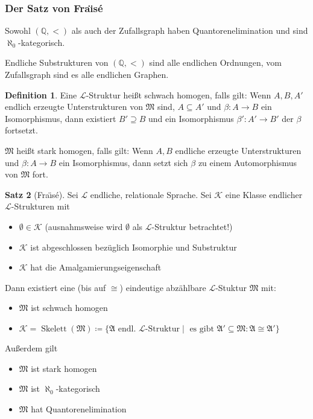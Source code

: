 \documentclass[12pt,parskip=full]{scrartcl}
\newcommand{\setQ}{\mathbb{Q}}
\theoremstyle{definition}
\newtheorem{theorem}{Satz}[section]
\newtheorem{definition}[theorem]{Definition}
\begin{document}
	\subsubsection{Der Satz von Fra\"\i s\'{e}}
	
	Sowohl $(\setQ, <)$ als auch der Zufallsgraph haben Quantorenelimination und sind $\aleph_0$-kategorisch.
	
	Endliche Substrukturen von $(\setQ, <)$ sind alle endlichen Ordnungen, vom Zufallsgraph sind es alle endlichen Graphen.
	
	\begin{definition}
		Eine $\mathcal{L}$-Struktur heißt schwach homogen, falls gilt: Wenn $A, B, A'$ endlich erzeugte Unterstrukturen von $\mathfrak{M}$ sind, $A \subseteq A'$ und $\beta: A \to B$ ein Isomorphismus, dann existiert $B' \supseteq B$ und ein Isomorphismus $\beta': A' \to B'$ der $\beta$ fortsetzt.
		
		$\mathfrak{M}$ heißt stark homogen, falls gilt: Wenn $A, B$ endliche erzeugte Unterstrukturen und $\beta: A \to B$ ein Isomorphismus, dann setzt sich $\beta$ zu einem Automorphismus von $\mathfrak{M}$ fort.
	\end{definition}

	\begin{theorem}[Fra\"\i s\'{e}]
		Sei $\mathcal{L}$ endliche, relationale Sprache. Sei $\mathcal{K}$ eine Klasse endlicher $\mathcal{L}$-Strukturen mit
		\begin{itemize}
			\item $\emptyset \in \mathcal{K}$ (ausnahmsweise wird $\emptyset$ als $\mathcal{L}$-Struktur betrachtet!)
			\item $\mathcal{K}$ ist abgeschlossen bezüglich Isomorphie und Substruktur
			\item $\mathcal{K}$ hat die Amalgamierungseigenschaft
		\end{itemize}
		Dann existiert eine (bis auf $\cong$) eindeutige abzählbare $\mathcal{L}$-Stuktur $\mathfrak{M}$ mit:
		\begin{itemize}
			\item $\mathfrak{M}$ ist schwach homogen
			\item $\mathcal{K} = \operatorname{Skelett}(\mathfrak{M}) \coloneqq \{ \mathfrak{A} \text{ endl. $\mathcal{L}$-Struktur} \mid \text{ es gibt } \mathfrak{A}' \subseteq \mathfrak{M}: \mathfrak{A} \cong \mathfrak{A}' \}$
		\end{itemize}
		Außerdem gilt
		\begin{itemize}
			\item $\mathfrak{M}$ ist stark homogen
			\item $\mathfrak{M}$ ist $\aleph_0$-kategorisch
			\item $\mathfrak{M}$ hat Quantorenelimination
		\end{itemize}
	\end{theorem}
\end{document}
